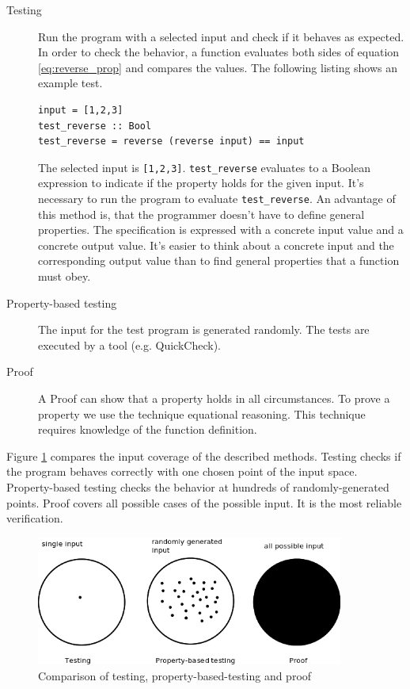 \begin{description}
\item[Testing] Run the program with a selected input and check if it behaves as expected. In order to check the behavior, a function evaluates both sides of equation \ref{eq:reverse_prop} and compares the values. The following listing shows an example test.

\begin{lstlisting}[caption={Function definition for testing},label={lst:testing}]
input = [1,2,3]
test_reverse :: Bool
test_reverse = reverse (reverse input) == input
\end{lstlisting}

The selected input is \verb|[1,2,3]|. \verb|test_reverse| evaluates to a Boolean expression to indicate if the property holds for the given input. It's necessary to run the program to evaluate \verb|test_reverse|.
An advantage of this method is, that the programmer doesn't have to define general properties. The specification is expressed with a concrete input value and a concrete output value. It's easier to think about a concrete input and the corresponding output value than to find general properties that a function must obey.
\item[Property-based testing] The input for the test program is generated randomly. The tests are executed by a tool (e.g. QuickCheck).
\item[Proof] A Proof can show that a property holds in all circumstances. To prove a property we use the technique equational reasoning. This technique requires knowledge of the function definition.
\end{description}

Figure \ref{fig:property_validation} compares the input coverage of the described methods. Testing checks if the program behaves correctly with one chosen point of the input space. Property-based testing checks the behavior at hundreds of randomly-generated points. Proof covers all possible cases of the possible input. It is the most reliable verification.

\begin{figure}
  \centering
     \includegraphics[width=0.9\textwidth]{testing}
  \caption{Comparison of testing, property-based-testing and proof}
  \label{fig:property_validation}
\end{figure}

